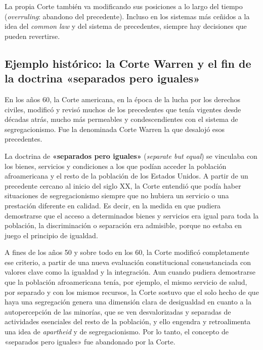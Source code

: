 \documentclass[12pt,oneside]{book}
\begin{document}
La propia Corte también va modificando sus posiciones a lo largo del tiempo (\textit{overruling}: abandono del precedente). Incluso en los sistemas más ceñidos a la idea del \textit{common law} y del sistema de precedentes, siempre hay decisiones que pueden revertirse.

\subsection{Ejemplo histórico: la Corte Warren y el fin de la doctrina «separados pero iguales»}

En los años 60, la Corte americana, en la época de la lucha por los derechos civiles, modificó y revisó muchos de los precedentes que tenía vigentes desde décadas atrás, mucho más permeables y condescendientes con el sistema de segregacionismo. Fue la denominada Corte Warren la que desalojó esos precedentes.

La doctrina de \textbf{«separados pero iguales»} (\textit{separate but equal}) se vinculaba con los bienes, servicios y condiciones a los que podían acceder la población afroamericana y el resto de la población de los Estados Unidos. A partir de un precedente cercano al inicio del siglo XX, la Corte entendió que podía haber situaciones de segregacionismo siempre que no hubiera un servicio o una prestación diferente en calidad. Es decir, en la medida en que pudiera demostrarse que el acceso a determinados bienes y servicios era igual para toda la población, la discriminación o separación era admisible, porque no estaba en juego el principio de igualdad.

A fines de los años 50 y sobre todo en los 60, la Corte modificó completamente ese criterio, a partir de una nueva evaluación constitucional consustanciada con valores clave como la igualdad y la integración.
Aun cuando pudiera demostrarse que la población afroamericana tenía, por ejemplo, el mismo servicio de salud, por separado y con los mismos recursos, la Corte sostuvo que el solo hecho de que haya una segregación genera una dimensión clara de desigualdad en cuanto a la autopercepción de las minorías, que se ven desvalorizadas y separadas de actividades esenciales del resto de la población, y ello engendra y retroalimenta una idea de \textit{apartheid} y de segregacionismo. Por lo tanto, el concepto de «separados pero iguales» fue abandonado por la Corte.
\end{document}
